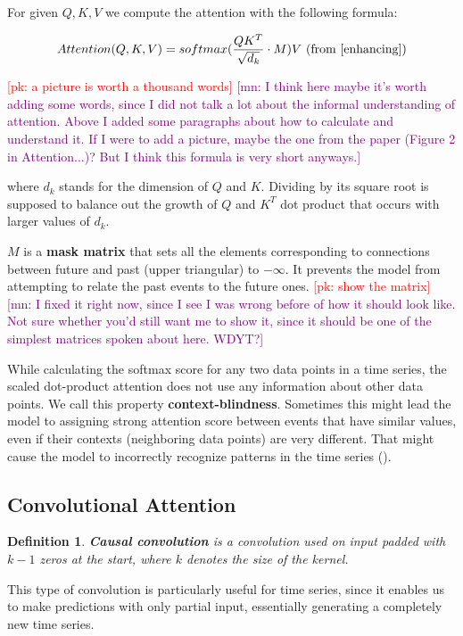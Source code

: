\documentclass[en]{pracamgr}
\newtheorem{defi}{Definition}[section]
\newcommand{\pk}[1]{\textcolor{red}{\small [pk: #1]}}
\newcommand{\mn}[1]{\textcolor{purple}{\small [mn: #1]}}
\begin{document}
For given $Q, K, V$ we compute the attention with the following formula:

$$ Attention(Q, K, V) = softmax(\frac{QK^{T}}{\sqrt{d_k}} \cdot M)V \textrm{ (from \cite{enhancing})} $$

\pk{a picture is worth a thousand words} \mn{I think here maybe it's worth adding some words, since I did not talk a lot about the informal understanding of attention. Above I added some paragraphs about how to calculate and understand it. If I were to add a picture, maybe the one from the paper (Figure 2 in Attention...)? But I think this formula is very short anyways.}

where $d_k$ stands for the dimension of $Q$ and $K$. Dividing by its square root is supposed to balance out the growth of $Q$ and $K^{T}$ dot product that occurs with larger values of $d_k$.

$M$ is a \textbf{mask matrix} that sets all the elements corresponding to connections between future and past (upper triangular) to $-\infty$. It prevents the model from attempting to relate the past events to the future ones. \pk{show the matrix} \mn{I fixed it right now, since I see I was wrong before of how it should look like. Not sure whether you'd still want me to show it, since it should be one of the simplest matrices spoken about here. WDYT?}





While calculating the softmax score for any two data points in a time series, the scaled dot-product attention does not use any information about other data points. We call this property \textbf{context-blindness}. Sometimes this might lead the model to assigning strong attention score between events that have similar values, even if their contexts (neighboring data points) are very different. That might cause the model to incorrectly recognize patterns in the time series (\cite{enhancing}).

\subsection{Convolutional Attention}


\begin{defi}\label{ts}
	\textbf{Causal convolution} is a convolution used on input padded with $k - 1$ zeros at the start, where $k$ denotes the size of the kernel.
	
\end{defi}
%
This type of convolution is particularly useful for time series, since it enables us to make predictions with only partial input, essentially generating a completely new time series.
\newline
\end{document}
